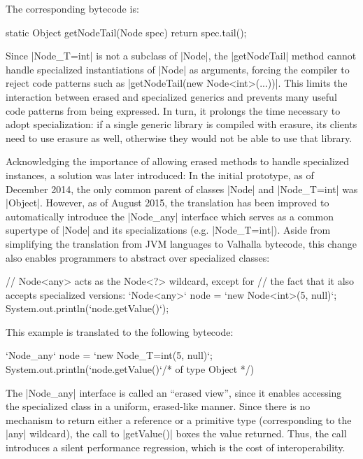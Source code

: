 The corresponding bytecode is:

\begin{lstlisting-nobreak}
static Object getNodeTail(Node spec) {
  return spec.tail();
}
\end{lstlisting-nobreak}

Since |Node_{T=int}| is not a subclass of |Node|, the |getNodeTail| method cannot handle specialized instantiations of |Node| as arguments, forcing the compiler to reject code patterns such as |getNodeTail(new Node<int>(...))|.
This limits the interaction between erased and specialized generics and prevents many useful code patterns from being expressed. In turn, it prolongs the time necessary to adopt specialization: if a single generic library is compiled with erasure, its clients need to use erasure as well, otherwise they would not be able to use that library.

Acknowledging the importance of allowing erased methods to handle specialized instances, a solution was later introduced: In the initial prototype, as of December 2014, the only common parent of classes |Node| and |Node_{T=int}| was |Object|. However, as of August 2015, the translation has been improved to automatically introduce the |Node_any| interface which serves as a common supertype of |Node| and its specializations (e.g. |Node_{T=int}|). Aside from simplifying the translation from JVM languages to Valhalla bytecode, this change also enables programmers to abstract over specialized classes:

\begin{lstlisting-nobreak}
// Node<any> acts as the Node<?> wildcard, except for
// the fact that it also accepts specialized versions:
`Node<any>` node = `new Node<int>(5, null)`;
System.out.println(`node.getValue()`);
\end{lstlisting-nobreak}

This example is translated to the following bytecode:

\begin{lstlisting-nobreak}
`Node_any` node = `new Node_{T=int}(5, null)`;
System.out.println(`node.getValue()`/* of type Object */)
\end{lstlisting-nobreak}

The |Node_any| interface is called an ``erased view'', since it enables accessing the specialized class in a uniform, erased-like manner. Since there is no mechanism to return either a reference or a primitive type (corresponding to the |any| wildcard), the call to |getValue()| boxes the value returned. Thus, the call introduces a silent performance regression, which is the cost of interoperability.

